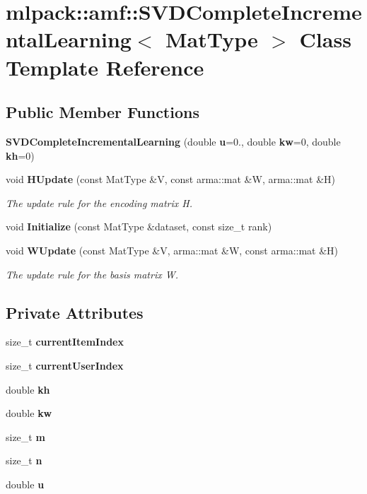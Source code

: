 \section{mlpack\-:\-:amf\-:\-:S\-V\-D\-Complete\-Incremental\-Learning$<$ Mat\-Type $>$ Class Template Reference}
\label{classmlpack_1_1amf_1_1SVDCompleteIncrementalLearning}
\subsection*{Public Member Functions}
\begin{DoxyCompactItemize}
\item 
{\bf S\-V\-D\-Complete\-Incremental\-Learning} (double {\bf u}=0., double {\bf kw}=0, double {\bf kh}=0)
\item 
void {\bf H\-Update} (const Mat\-Type \&V, const arma\-::mat \&W, arma\-::mat \&H)
\begin{DoxyCompactList}\small\item\em The update rule for the encoding matrix H. \end{DoxyCompactList}\item 
void {\bf Initialize} (const Mat\-Type \&dataset, const size\-\_\-t rank)
\item 
void {\bf W\-Update} (const Mat\-Type \&V, arma\-::mat \&W, const arma\-::mat \&H)
\begin{DoxyCompactList}\small\item\em The update rule for the basis matrix W. \end{DoxyCompactList}\end{DoxyCompactItemize}
\subsection*{Private Attributes}
\begin{DoxyCompactItemize}
\item 
size\-\_\-t {\bf current\-Item\-Index}
\item 
size\-\_\-t {\bf current\-User\-Index}
\item 
double {\bf kh}
\item 
double {\bf kw}
\item 
size\-\_\-t {\bf m}
\item 
size\-\_\-t {\bf n}
\item 
double {\bf u}
\end{DoxyCompactItemize}


